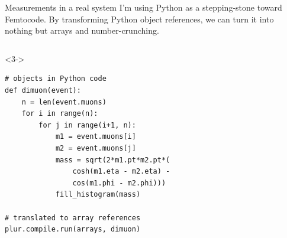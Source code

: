 \documentclass[aspectratio=169]{beamer}
\begin{document}
\begin{frame}[fragile]{Measurements in a real system}
\vspace{0.5 cm}
I'm using Python as a stepping-stone toward Femtocode. By transforming Python object references, we can turn it into nothing but arrays and number-crunching.

\vspace{0.2 cm}

\begin{columns}[c]
\scriptsize
\begin{uncoverenv}<3->
\begin{verbatim}
# objects in Python code
def dimuon(event):
    n = len(event.muons)
    for i in range(n):
        for j in range(i+1, n):
            m1 = event.muons[i]
            m2 = event.muons[j]
            mass = sqrt(2*m1.pt*m2.pt*(
                cosh(m1.eta - m2.eta) -
                cos(m1.phi - m2.phi)))
            fill_histogram(mass)

# translated to array references
plur.compile.run(arrays, dimuon)
\end{verbatim}
\end{uncoverenv}


\end{columns}
\end{frame}
\end{document}

